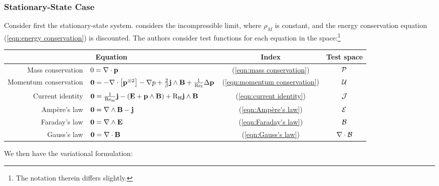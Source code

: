 \subsubsection*{Stationary-State Case}
    Consider first the stationary-state system. \cite{LHF22} considers the incompressible limit, where $\rho_{M}$ is constant, and the energy conservation equation (\ref{eqn:energy conservation}) is discounted. The authors consider test functions for each equation in the space:\footnote{The notation therein differs slightly.}
    \begin{center}\begin{tabular}{ r l c | c }
        \multicolumn{2}{c}{Equation}  &  Index  &  Test space  \\
        \hline\hline
        Mass conservation  &  $0  =  \nabla\cdot\mathbf{p}$  &  (\ref{eqn:mass conservation})  &  $\mathcal{P}$  \\
        Momentum conservation  &  $\mathbf{0} 
         =  - \nabla\cdot\left[\mathbf{p}^{\otimes 2}\right] - \nabla p + \frac{2}{\beta}\mathbf{j}\wedge\mathbf{B} + \frac{1}{\mathrm{Re}_{\mathrm{f}}}\Delta\mathbf{p}$  &  (\ref{eqn:momentum conservation})  &  $\mathcal{U}$  \\
        \hline
        Current identity  &  $\mathbf{0}  =  \frac{1}{\mathrm{Re}_{\mathrm{m}}}\mathbf{j} - (\mathbf{E} + \mathbf{p}\wedge\mathbf{B}) + \mathrm{R}_{\mathrm{H}}\mathbf{j}\wedge\mathbf{B}$  &  (\ref{eqn:current identity})  &  $\mathcal{J}$  \\
        \hline
        Ampère's law  &  $\mathbf{0}  =  \nabla\wedge\mathbf{B} - \mathbf{j}$  &  (\ref{eqn:Ampère's law})  &  $\mathcal{E}$  \\
        Faraday's law  &  $\mathbf{0}  =  \nabla\wedge\mathbf{E}$  &  (\ref{eqn:Faraday's law})  &  $\mathcal{B}$  \\
        Gauss's law  &  $\mathbf{0}  =  \nabla\cdot\mathbf{B}$  &  (\ref{eqn:Gauss's law})  &  $\nabla\cdot\mathcal{B}$  \\
    \end{tabular}\end{center}
    We then have the variational formulation: 
